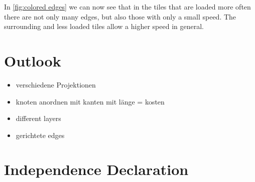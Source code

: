 \documentclass
[
	paper = a4,
    pagesize,
	12 pt,
	oneside,                       %
    open = right,
	DIV = calc,
	BCOR = 0 mm,                   %
	bibtotoc
]
{scrbook}
\begin{document}
In \cref{fig:colored edges} we can now see that in the tiles that are loaded more often there are not only many edges, but also those with only a small speed.
The surrounding and less loaded tiles allow a higher speed in general.

\chapter{Outlook}
\begin{itemize}
	\item verschiedene Projektionen
	\item knoten anordnen mit kanten mit länge = kosten
	\item different layers
	\item gerichtete edges
\end{itemize}



\chapter*{Independence Declaration}

\end{document}
